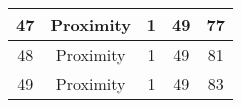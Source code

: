 \documentclass[results.tex]{subfiles}
\begin{document}
\begin{center}
\begin{tabular}{| c || c | c | c | c |}
            \hline
            47                      & Proximity                    & 1                      & 49                      & 77                   \\
            \hline
            48                      & Proximity                    & 1                      & 49                      & 81                   \\
            \hline
            49                      & Proximity                    & 1                      & 49                      & 83                   \\
            \hline
        \end{tabular}
    \end{center}
\end{document}
